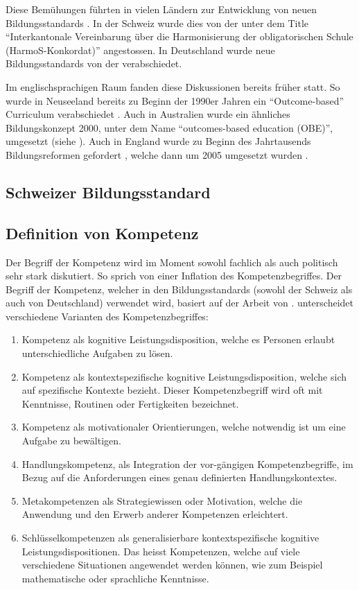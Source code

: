 Diese Bemühungen führten in vielen Ländern zur Entwicklung von neuen Bildungsstandards \citep{Berner2006}. In der Schweiz wurde dies von der \citet{EDKSchweizerKonfernezderKantonalenErziehungsdirektoren2004} unter dem Title "`Interkantonale Vereinbarung über die Harmonisierung der obligatorischen Schule (HarmoS-Konkordat)"' angestossen. In Deutschland wurde neue Bildungsstandards von der \citet{Kultusministerkonferenz2004} verabschiedet.

Im englischsprachigen Raum fanden diese Diskussionen bereits früher statt. So wurde in Neuseeland bereits zu Beginn der 1990er Jahren ein "`Outcome-based"' Curriculum verabschiedet \citep{McGee1996}. Auch in Australien wurde ein ähnliches Bildungskonzept 2000,  unter dem Name "`outcomes-based education (OBE)"', umgesetzt (siehe \citet{Killen2000}). Auch in England wurde zu Beginn des Jahrtausends Bildungsreformen gefordert \citep{Millar1999}, welche dann um 2005 umgesetzt wurden \citep{Huber2006}.

\subsection{Schweizer Bildungsstandard}



\subsection{Definition von Kompetenz}

Der Begriff der Kompetenz wird im Moment sowohl fachlich als auch politisch sehr stark diskutiert. So sprich \citet{Weinert2001b} von einer Inflation des Kompetenzbegriffes.
Der Begriff der Kompetenz, welcher in den Bildungsstandards (sowohl der Schweiz als auch von Deutschland) verwendet wird, basiert auf der Arbeit von \citet{Klieme2004}.
\citet{Klieme2004} unterscheidet verschiedene Varianten des Kompetenzbegriffes: 
\begin{enumerate}
\item Kompetenz als kognitive Leistungsdisposition, welche es Personen erlaubt unterschiedliche Aufgaben zu lösen.
\item Kompetenz als kontextspezifische kognitive Leistungsdisposition, welche sich auf spezifische Kontexte bezieht. Dieser Kompetenzbegriff wird oft mit Kenntnisse, Routinen oder Fertigkeiten bezeichnet.
\item Kompetenz als motivationaler Orientierungen, welche notwendig ist um eine Aufgabe zu bewältigen.
\item Handlungskompetenz, als Integration der vor-gängigen Kompetenzbegriffe, im Bezug auf die Anforderungen eines genau definierten Handlungskontextes.
\item Metakompetenzen als Strategiewissen oder Motivation, welche die Anwendung und den Erwerb anderer Kompetenzen erleichtert.
\item Schlüsselkompetenzen als generalisierbare kontextspezifische kognitive Leistungsdispositionen. Das heisst Kompetenzen, welche auf viele verschiedene Situationen angewendet werden können, wie zum Beispiel mathematische oder sprachliche Kenntnisse.
\end{enumerate}




